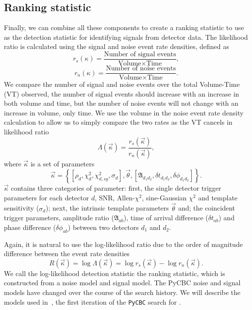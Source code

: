 \subsection{\label{2:sec:ranking-statistic}Ranking statistic}

Finally, we can combine all these components to create a ranking statistic to use as the detection statistic for identifying \gwadj signals from \gwadj detector data. The likelihood ratio is calculated using the signal and noise event rate densities, defined as~\cite{PyCBC_global:2020}
%
\begin{equation}
    r_{s}(\kappa) = \frac{\text{Number of signal events}}{\text{Volume} \times \text{Time}},
\end{equation}
%
\begin{equation}
    r_{n}(\kappa) = \frac{\text{Number of noise events}}{\text{Volume} \times \text{Time}}.
\end{equation}
%
We compare the number of signal and noise events over the total Volume-Time (VT) observed, the number of signal events should increase with an increase in both volume and time, but the number of noise events will not change with an increase in volume, only time. We use the volume in the noise event rate density calculation to allow us to simply compare the two rates as the VT cancels in likelihood ratio
%
\begin{equation}
    \Lambda(\vec{\kappa}) = \frac{r_{s}(\vec{\kappa})}{r_{n}(\vec{\kappa})},
\end{equation}
%
where $\vec{\kappa}$ is a set of parameters
%
\begin{equation}
    \vec{\kappa} = \left\{ \left[\rho_{d}, \chi^{2}_{d}, \chi^{2}_{d, sg}, \sigma_{d}\right], \vec{\theta}, \left[\mathfrak{A}_{d_{1}d_{2}}, \delta t_{d_{1}d_{2}}, \delta\phi_{d_{1}d_{2}}\right] \right\}.
\end{equation}
%
$\vec{\kappa}$ contains three categories of parameter: first, the single detector trigger parameters for each detector $d$, SNR, Allen-$\chi^{2}$, sine-Gaussian $\chi^{2}$ and template sensitivity ($\sigma_{d}$); next, the intrinsic template parameters $\vec{\theta}$ and; the coincident trigger parameters, amplitude ratio ($\mathfrak{A}_{ab}$), time of arrival difference ($\delta t_{ab}$) and phase difference ($\delta \phi_{ab}$) between two detectors $d_{1}$ and $d_{2}$.

Again, it is natural to use the log-likelihood ratio due to the order of magnitude difference between the event rate densities
%
\begin{equation}
    R(\vec{\kappa}) = \log \Lambda(\vec{\kappa}) = \log r_{s}(\vec{\kappa}) - \log r_{n}(\vec{\kappa}).
\end{equation}
%
We call the log-likelihood detection statistic the ranking statistic, which is constructed from a noise model and signal model. The PyCBC noise and signal models have changed over the course of the \gwadj search history. We will describe the models used in~\cite{PyCBC:2016}, the first iteration of the \texttt{PyCBC} search for \cbcs.

